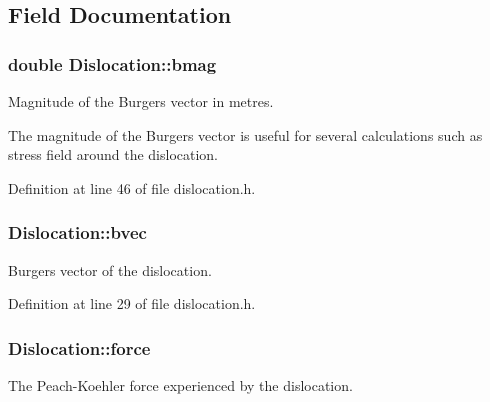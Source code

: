 \subsection{Field Documentation}
\hypertarget{classDislocation_a2b0284639af7fdfdf44fa0ef7fc1632e}{
\subsubsection[{bmag}]{\setlength{\rightskip}{0pt plus 5cm}double Dislocation\-::bmag\hspace{0.3cm}{\ttfamily [protected]}}}\label{d3/dc6/classDislocation_a2b0284639af7fdfdf44fa0ef7fc1632e}


Magnitude of the Burgers vector in metres. 

The magnitude of the Burgers vector is useful for several calculations such as stress field around the dislocation. 

Definition at line 46 of file dislocation.\-h.

\hypertarget{classDislocation_aad45c2eaade195f374707afb648ed17e}{
\subsubsection[{bvec}]{ Dislocation\-::bvec\hspace{0.3cm}{\ttfamily [protected]}}}\label{d3/dc6/classDislocation_aad45c2eaade195f374707afb648ed17e}


Burgers vector of the dislocation. 



Definition at line 29 of file dislocation.\-h.

\hypertarget{classDislocation_a9c19c7493d896bd845c489e1ec3cbbb6}{
\subsubsection[{force}]{ Dislocation\-::force\hspace{0.3cm}{\ttfamily [protected]}}}\label{d3/dc6/classDislocation_a9c19c7493d896bd845c489e1ec3cbbb6}


The Peach-\/\-Koehler force experienced by the dislocation. 

